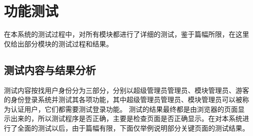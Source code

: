\section{功能测试}

在本系统的测试过程中，对所有模块都进行了详细的测试，鉴于篇幅所限，在这里仅给出部分模块的测试过程和结果。

\subsection{测试内容与结果分析}
测试内容按找用户身份分为三部分，分别以超级管理员管理员、模块管理员、游客的身份登录系统并测试其各项功能，其中超级管理员管理员、模块管理员可以被称为认证用户，它们都需要测试登录功能。
测试的结果最终都是由浏览器的页面显示出来的，所以测试程序是否正确，主要是检查页面是否正确显示。在对本系统进行了全面的测试以后，由于篇幅有限，下面仅举例说明部分关键页面的测试结果。

